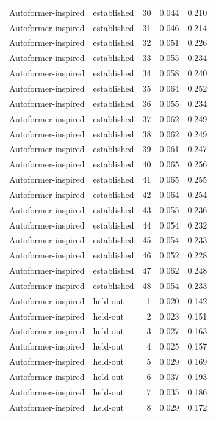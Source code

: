 \begin{tabular}{llrrr}
Autoformer-inspired & established & 30 & 0.044 & 0.210 \\
Autoformer-inspired & established & 31 & 0.046 & 0.214 \\
Autoformer-inspired & established & 32 & 0.051 & 0.226 \\
Autoformer-inspired & established & 33 & 0.055 & 0.234 \\
Autoformer-inspired & established & 34 & 0.058 & 0.240 \\
Autoformer-inspired & established & 35 & 0.064 & 0.252 \\
Autoformer-inspired & established & 36 & 0.055 & 0.234 \\
Autoformer-inspired & established & 37 & 0.062 & 0.249 \\
Autoformer-inspired & established & 38 & 0.062 & 0.249 \\
Autoformer-inspired & established & 39 & 0.061 & 0.247 \\
Autoformer-inspired & established & 40 & 0.065 & 0.256 \\
Autoformer-inspired & established & 41 & 0.065 & 0.255 \\
Autoformer-inspired & established & 42 & 0.064 & 0.254 \\
Autoformer-inspired & established & 43 & 0.055 & 0.236 \\
Autoformer-inspired & established & 44 & 0.054 & 0.232 \\
Autoformer-inspired & established & 45 & 0.054 & 0.233 \\
Autoformer-inspired & established & 46 & 0.052 & 0.228 \\
Autoformer-inspired & established & 47 & 0.062 & 0.248 \\
Autoformer-inspired & established & 48 & 0.054 & 0.233 \\
Autoformer-inspired & held-out & 1 & 0.020 & 0.142 \\
Autoformer-inspired & held-out & 2 & 0.023 & 0.151 \\
Autoformer-inspired & held-out & 3 & 0.027 & 0.163 \\
Autoformer-inspired & held-out & 4 & 0.025 & 0.157 \\
Autoformer-inspired & held-out & 5 & 0.029 & 0.169 \\
Autoformer-inspired & held-out & 6 & 0.037 & 0.193 \\
Autoformer-inspired & held-out & 7 & 0.035 & 0.186 \\
Autoformer-inspired & held-out & 8 & 0.029 & 0.172 \\

\end{tabular}
